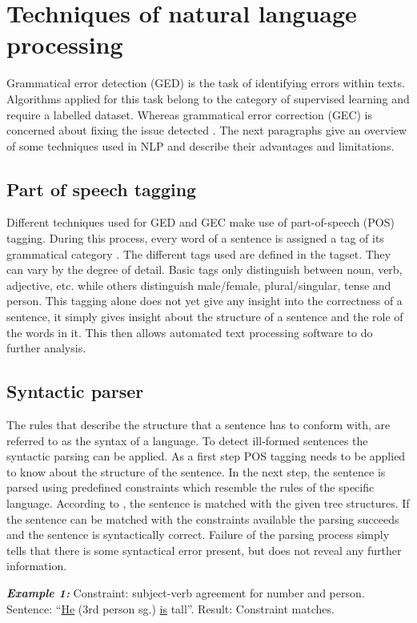 \documentclass[runningheads]{llncs}
\begin{document}
\section{Techniques of natural language processing}
Grammatical error detection (GED) is the task of identifying errors within texts. Algorithms applied for this task belong to the category of supervised learning and require a labelled dataset. Whereas grammatical error correction (GEC) is concerned about fixing the issue detected \cite{bell_context_2019}. The next paragraphs give an overview of some techniques used in NLP and describe their advantages and limitations.

\subsection{Part of speech tagging}
Different techniques used for GED and GEC make use of part-of-speech (POS) tagging. During this process, every word of a sentence is assigned a tag of its grammatical category \citep{noauthor_pos_2018}. The different tags used are defined in the tagset. They can vary by the degree of detail. Basic tags only distinguish between noun, verb, adjective, etc. while others distinguish male/female, plural/singular, tense and person. This tagging alone does not yet give any insight into the correctness of a sentence, it simply gives insight about the structure of a sentence and the role of the words in it. This then allows automated text processing software to do further analysis.

\subsection{Syntactic parser}   
The rules that describe the structure that a sentence has to conform with, are referred to as the syntax of a language. To detect ill-formed sentences the syntactic parsing can be applied. As a first step POS tagging needs to be applied to know about the structure of the sentence. In the next step, the sentence is parsed using predefined constraints which resemble the rules of the specific language. According to \textcite{manchanda_various_2016}, the sentence is matched with the given tree structures. If the sentence can be matched with the constraints available the parsing succeeds and the sentence is syntactically correct. Failure of the parsing process simply tells that there is some syntactical error present, but does not reveal any further information.

\textbf{\textit{Example 1:}} Constraint: subject-verb agreement for number and person. Sentence: ``\underline{He} (3rd person sg.) \underline{is} tall''. Result: Constraint matches.
\end{document}
